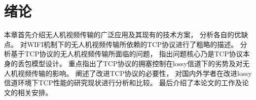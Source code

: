 
\chapter{绪论}
\par
本章首先介绍无人机视频传输的广泛应用及其现有的技术方案，
分析各自的优缺点。
对WIFI机制下的无人机视频传输所依赖的TCP协议进行了粗略的描述。
分析基于TCP协议的无人机视频传输所面临的问题，
指出问题核心乃是TCP协议本身的丢包模型设计。
重点指出了TCP协议的拥塞控制在lossy信道下的劣势及对无人机视频传输的影响。
阐述了改进TCP协议的必要性，
对国内外学者在改进lossy信道环境下TCP性能的研究现状进行分析和比较。
最后介绍了本论文的工作及论文的相关安排。
